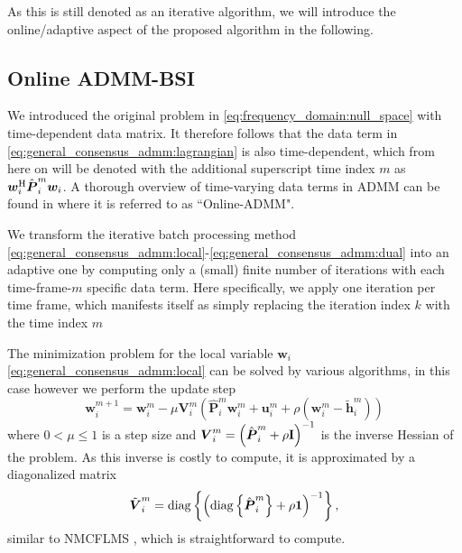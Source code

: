 \documentclass{article}
\newcommand{\hf}{{\bm{h}}}
\newcommand{\wf}{{\bm{w}}}
\newcommand{\uuf}{{\bm{u}}}
\newcommand{\aRhof}{{\bm{{P}}}}
\newcommand{\I}{\mtxb{I}}
\begin{document}
As this is still denoted as an iterative algorithm, we will introduce the online/adaptive aspect of the proposed algorithm in the following.

\subsection{Online ADMM-BSI}
\label{ssec:online_admm}
We introduced the original problem in \eqref{eq:frequency_domain:null_space} with time-dependent data matrix. It therefore follows that the data term in \eqref{eq:general_consensus_admm:lagrangian} is also time-dependent, which from here on will be denoted with the additional superscript time index \(m\) as \(\wf_i^\herm \hat{\aRhof}_i^{m} \wf_i\).
A thorough overview of time-varying data terms in ADMM can be found in \cite{wangOnlineAlternatingDirection2013,hosseiniOnlineDistributedADMM2014} where it is referred to as ``Online-ADMM".

We transform the iterative batch processing method \eqref{eq:general_consensus_admm:local}-\eqref{eq:general_consensus_admm:dual} into an adaptive one by computing only a (small) finite number of iterations with each time-frame-\(m\) specific data term.
Here specifically, we apply one iteration per time frame, which manifests itself as simply replacing the iteration index \(k\) with the time index \(m\)

The minimization problem for the local variable \(\wf_i\) \eqref{eq:general_consensus_admm:local} can be solved by various algorithms, in this case however we perform the update step
\begin{equation}
    \wf_i^{m+1} = \wf_i^{m} - \mu \bm{{V}}_i^m \left( \hat{\aRhof}_i^m \wf_i^m + \uuf_i^m + \rho\left(\wf_i^m - \tilde{\hf}_i^{m}\right)\right)\label{eq:online_admm:local_update}
\end{equation}
where \(0  < \mu\leq 1\) is a step size and \(\bm{{V}}_i^m = \left(\hat{\aRhof}_i^m + \rho \I \right)^{-1}\) is the inverse Hessian of the problem.
As this inverse is costly to compute, it is approximated by a diagonalized matrix
\begin{equation}
    \tilde{\bm{{V}}}_i^m = \operatorname{diag} \left\{ \left( \operatorname{diag} \left\{ \hat{\aRhof}_i^m \right\} + \rho \mtxb{1} \right)^{-1}\right\},
\end{equation}
similar to NMCFLMS \cite{huangClassFrequencydomainAdaptive2003}, which is straightforward to compute.
\end{document}

